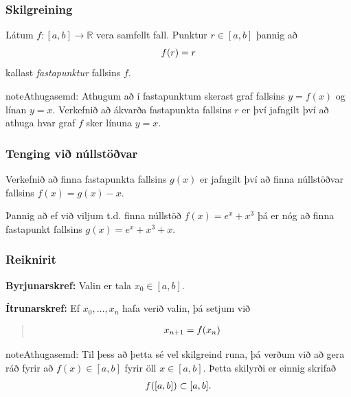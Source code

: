 \documentclass[a4paper,10pt,icelandic]{sphinxmanual}
\begin{document}
\subsubsection{Skilgreining}
\label{kafli02:id1}
Látum \(f : [a,b] \to \mathbb R\) vera samfellt fall. Punktur
\(r \in [a,b]\) þannig að
\begin{gather}
\begin{split}f(r) = r\end{split}\notag
\end{gather}
kallast \emph{fastapunktur} fallsins \(f\).

\begin{notice}{note}{Athugasemd:}
Athugum að í fastapunktum skerast graf fallsins \(y=f(x)\) og línan
\(y=x\). Verkefnið að ákvarða fastapunkta fallsins \(r\) er því
jafngilt því að athuga hvar graf \(f\) sker línuna \(y=x\).
\end{notice}


\subsubsection{Tenging við núllstöðvar}
\label{kafli02:tenging-vi-nullstovar}\label{kafli02:fastapunktar-nullstodvar}
Verkefnið að finna fastapunkta fallsins \(g(x)\) er jafngilt því að
finna núllstöðvar fallsins \(f(x)=g(x)-x\).

Þannig að ef við viljum t.d. finna núllstöð \(f(x) = e^x + x^3\) þá er nóg að finna fastapunkt
fallsins \(g(x) = e^x + x^3 + x\).


\subsubsection{Reiknirit}
\label{kafli02:reiknirit}
\textbf{Byrjunarskref:}      Valin er tala \(x_0\in [a,b]\).

\textbf{Ítrunarskref:}       Ef \(x_0,\dots,x_n\) hafa verið valin, þá setjum við
\begin{quote}
\begin{gather}
\begin{split}x_{n+1}=f(x_n)\end{split}\notag
\end{gather}\end{quote}

\begin{notice}{note}{Athugasemd:}
Til þess að þetta sé vel skilgreind runa, þá verðum við að gera ráð
fyrir að \(f(x)\in [a,b]\) fyrir öll \(x\in [a,b]\). Þetta
skilyrði er einnig skrifað
\begin{gather}
\begin{split}f([a,b])\subset [a,b].\end{split}\notag
\end{gather}\end{notice}
\end{document}
